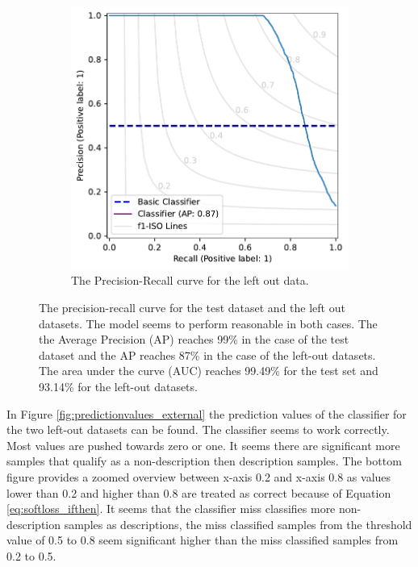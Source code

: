 \documentclass[a4paper, 12pt, oneside]{book} %
\begin{document}
\begin{figure} [h!]
\begin{subfigure}[b]{0.49\textwidth}
         \includegraphics[width=\textwidth]{precision_recall_plot_extern.pdf}
         \caption{The Precision-Recall curve for the left out data.}
         \label{fig:precision_recall_curve_test_external}
     \end{subfigure}
     \caption[Precision recall curves for test and left-out datasets]{The precision-recall curve for the test dataset and the left out datasets. The model seems to perform reasonable in both cases. The the Average Precision (AP) reaches 99\% in the case of the test dataset and the AP reaches 87\% in the case of the left-out datasets. The area under the curve (AUC) reaches 99.49\% for the test set and 93.14\% for the left-out datasets.}
     \label{fig:precision-recall}
\end{figure}

In Figure \ref{fig:predictionvalues_external} the prediction values of the classifier for the two left-out datasets can be found.
The classifier seems to work correctly.
Most values are pushed towards zero or one.
It seems there are significant more samples that qualify as a non-description then description samples.
The bottom figure provides a zoomed overview between x-axis 0.2 and x-axis 0.8 as values lower than 0.2 and higher than 0.8 are treated as correct because of Equation \ref{eq:softloss_ifthen}.
It seems that the classifier miss classifies more non-description samples as descriptions, the miss classified samples from the threshold value of 0.5 to 0.8 seem significant higher than the miss classified samples from 0.2 to 0.5.
\end{document}
